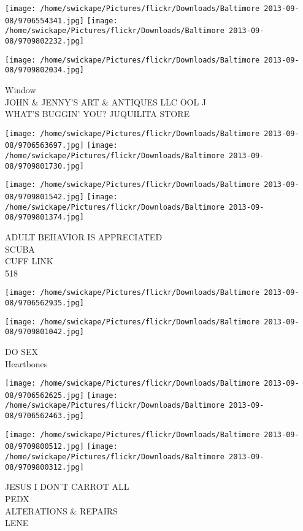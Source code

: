 \documentclass[10pt,letterpaper]{article}
\begin{document}
\texttt{[image: /home/swickape/Pictures/flickr/Downloads/Baltimore 2013-09-08/9706554341.jpg]}
\texttt{[image: /home/swickape/Pictures/flickr/Downloads/Baltimore 2013-09-08/9709802232.jpg]}

\vspace{0.25in}
\texttt{[image: /home/swickape/Pictures/flickr/Downloads/Baltimore 2013-09-08/9709802034.jpg]}

Window\\
JOHN \& JENNY'S ART \& ANTIQUES LLC OOL J\\
WHAT'S BUGGIN' YOU? JUQUILITA STORE\\
\pagebreak

\texttt{[image: /home/swickape/Pictures/flickr/Downloads/Baltimore 2013-09-08/9706563697.jpg]}
\texttt{[image: /home/swickape/Pictures/flickr/Downloads/Baltimore 2013-09-08/9709801730.jpg]}

\texttt{[image: /home/swickape/Pictures/flickr/Downloads/Baltimore 2013-09-08/9709801542.jpg]}
\texttt{[image: /home/swickape/Pictures/flickr/Downloads/Baltimore 2013-09-08/9709801374.jpg]}

ADULT BEHAVIOR IS APPRECIATED\\
SCUBA\\
CUFF LINK\\
518\\
\pagebreak

\texttt{[image: /home/swickape/Pictures/flickr/Downloads/Baltimore 2013-09-08/9706562935.jpg]}

\vspace{0.25in}
\texttt{[image: /home/swickape/Pictures/flickr/Downloads/Baltimore 2013-09-08/9709801042.jpg]}

DO SEX\\
Heartbones\\
\pagebreak

\texttt{[image: /home/swickape/Pictures/flickr/Downloads/Baltimore 2013-09-08/9706562625.jpg]}
\texttt{[image: /home/swickape/Pictures/flickr/Downloads/Baltimore 2013-09-08/9706562463.jpg]}

\texttt{[image: /home/swickape/Pictures/flickr/Downloads/Baltimore 2013-09-08/9709800512.jpg]}
\texttt{[image: /home/swickape/Pictures/flickr/Downloads/Baltimore 2013-09-08/9709800312.jpg]}

JESUS I DON'T CARROT ALL\\
PEDX\\
ALTERATIONS \& REPAIRS\\
LENE\\
\pagebreak
\end{document}
